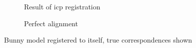 \begin{figure}[h]
\centering
\hspace*{\fill}%
\begin{subfigure}{.48\textwidth}
{
	\setlength{\fboxsep}{0pt}%
	\setlength{\fboxrule}{0.5pt}%
	\caption{Result of \gls{icp} registration}
}
\end{subfigure}%
\hfill%
\begin{subfigure}{.48\textwidth}
{
	\setlength{\fboxsep}{0pt}%
	\setlength{\fboxrule}{0.5pt}%
	\caption{Perfect alignment}
}
\end{subfigure}%
\caption{Bunny model registered to itself, true correspondences shown}
\label{fig:bunny_first_tcor}
\end{figure}

